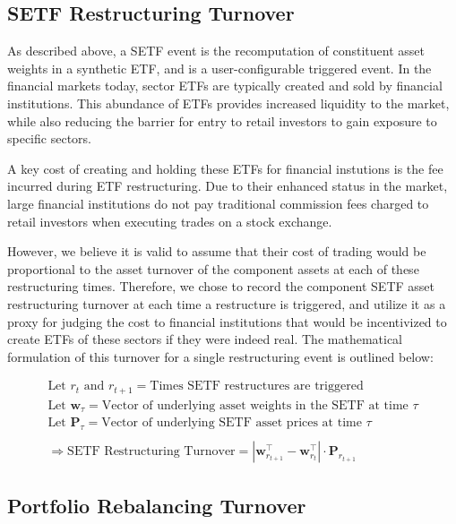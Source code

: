 \documentclass[../main.tex]{subfiles}
\begin{document}
\subsection{SETF Restructuring Turnover}

As described above, a SETF event is the recomputation of constituent asset weights in a synthetic ETF, and is a user-configurable triggered event. In the financial markets today, sector ETFs are typically created and sold by financial institutions. This abundance of ETFs provides increased liquidity to the market, while also reducing the barrier for entry to retail investors to gain exposure to specific sectors.

A key cost of creating and holding these ETFs for financial instutions is the fee incurred during ETF restructuring. Due to their enhanced status in the market, large financial institutions do not pay traditional commission fees charged to retail investors when executing trades on a stock exchange.

However, we believe it is valid to assume that their cost of trading would be proportional to the asset turnover of the component assets at each of these restructuring times. Therefore, we chose to record the component SETF asset restructuring turnover at each time a restructure is triggered, and utilize it as a proxy for judging the cost to financial institutions that would be incentivized to create ETFs of these sectors if they were indeed real. The mathematical formulation of this turnover for a single restructuring event is outlined below:

\begin{gather*}
    \text{Let $r_t$ and $r_{t+1}$} = \text{Times SETF restructures are triggered} \\
    \text{Let $\boldsymbol{w}_\tau$} = \text{Vector of underlying asset weights in the SETF at time $\tau$} \\
    \text{Let $\boldsymbol{P}_\tau$} = \text{Vector of underlying SETF asset prices at time $\tau$} \\
    \\
    \Rightarrow \text{SETF Restructuring Turnover} = \left| \boldsymbol{w}_{r_{t+1}}^\intercal - \boldsymbol{w}_{r_{t}}^\intercal \right| \cdot \boldsymbol{P}_{r_{t + 1}}
\end{gather*}

\subsection{Portfolio Rebalancing Turnover}
\end{document}
